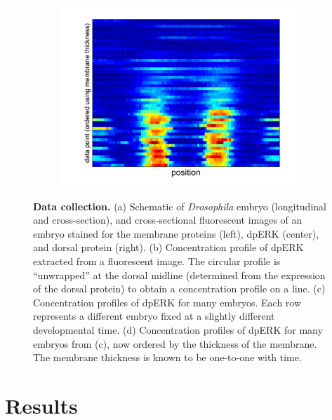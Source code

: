 \documentclass[10pt]{article}
\begin{document}
\begin{figure}[H]
\begin{center}
\begin{subfigure}{0.45\textwidth}
\includegraphics[width=\textwidth]{data_ordered_membrane}
\caption{}
\end{subfigure}
\end{center}
\caption{{\bf Data collection.} (a) Schematic of {\em Drosophila} embryo (longitudinal and cross-section), and cross-sectional fluorescent images of an embryo stained for the membrane proteins (left), dpERK (center), and dorsal protein (right).
(b) Concentration profile of dpERK extracted from a fluorescent image. The circular profile is ``unwrapped'' at the dorsal midline (determined from the expression of the dorsal protein) to obtain a concentration profile on a line.
(c) Concentration profiles of dpERK for many embryos. Each row represents a different embryo fixed at a slightly different developmental time.
(d) Concentration profiles of dpERK for many embryos from (c), now ordered by the thickness of the membrane. The membrane thickness is known to be one-to-one with time.}
\label{fig:background}
\end{figure}

\section*{Results}
\end{document}
